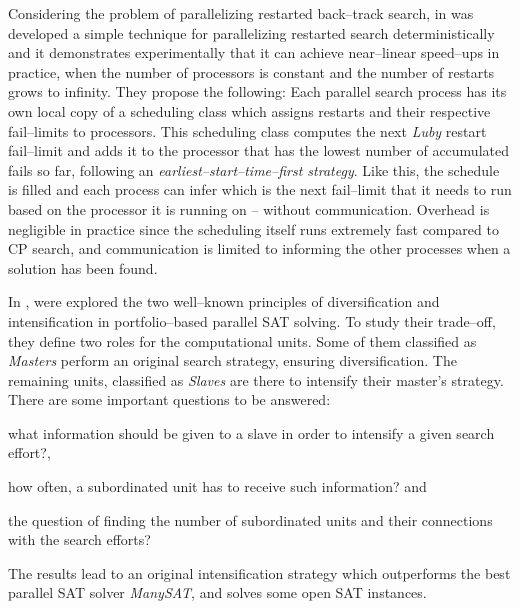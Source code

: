 Considering the problem of parallelizing restarted back--track search, in \cite{Cire2011} was developed a simple technique for parallelizing restarted search deterministically and it demonstrates experimentally that it can achieve near--linear speed--ups in practice, when the number of processors is constant and the number of restarts grows to infinity. They propose the following: Each parallel search process has its own local copy of a scheduling class which assigns restarts and their respective fail--limits to processors. This scheduling class computes the next {\it Luby} restart fail--limit and adds it to the processor that has the lowest number of accumulated fails so far, following an {\it earliest--start--time--first strategy}. Like this, the schedule is filled and each process can infer which is the next fail--limit that it needs to run based on the processor it is running on -- without communication. Overhead is negligible in practice since the scheduling itself runs extremely fast compared to CP search, and communication is limited to informing the other processes when a solution has been found.

In \cite{Guo2010}, were explored the two well--known principles of diversification and intensification in portfolio--based parallel SAT solving. To study their trade--off, they define two roles for the computational units. Some of them classified as {\it Masters} perform an original search strategy, ensuring diversification. The remaining units, classified as {\it Slaves} are there to intensify their master's strategy. There are some important questions to be answered:
\begin{inparaenum}[i)]
	\item what information should be given to a slave in order to intensify a given search effort?, 
	\item how often, a subordinated unit has to receive such information? and 
	\item the question of finding the number of subordinated units and their connections with the search efforts? 
\end{inparaenum}
The results lead to an original intensification strategy which outperforms the best parallel SAT solver {\it ManySAT}, and solves some open SAT instances.

